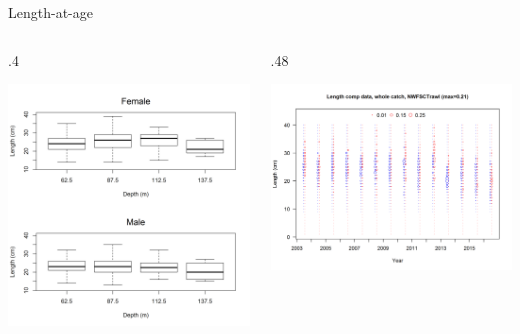 \documentclass[ignorenonframetext,compress]{beamer}
\def\begincols{\begin{columns}}
\def\begincol{\begin{column}}
\def\endcol{\end{column}}
\def\endcols{\end{columns}}
\begin{document}
\begin{frame}{Length-at-age}

\begincols
 \begincol{.4\textwidth}

\includegraphics{Figures/NWFSCtrawl_lengthdepth.png}

\endcol
\begincol{.48\textwidth}

\includegraphics{r4ss/plots_mod1/comp_lendat_bubflt8mkt0.png}

\endcol
\endcols

\end{frame}
\end{document}
